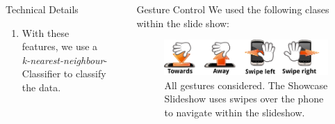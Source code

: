 \documentclass[final,hyperref={pdfpagelabels=false}]{beamer}
\begin{document}
\begin{frame}[t]
\begin{columns}[t]
\begin{column}{.465\textwidth}
\begin{block}{Technical Details}
\begin{enumerate}
\item With these features, we use a \emph{k-nearest-neighbour}-Classifier to classify the data.
\end{enumerate}


\end{block}






\end{column} %

\begin{column}{.03\textwidth}\end{column} %
 
\begin{column}{.465\textwidth} %



\begin{block}{Gesture Control}
We used the following clases within the slide show:
\begin{figure}

\centering
\includegraphics[width=.9\columnwidth]{./pics/gestures3}
\caption{All gestures considered. The Showcase Slideshow uses swipes over the phone to navigate within the slideshow.}
\label{fig:classes}
\end{figure}

\end{block}



\end{column}
\end{columns}
\end{frame}
\end{document}
